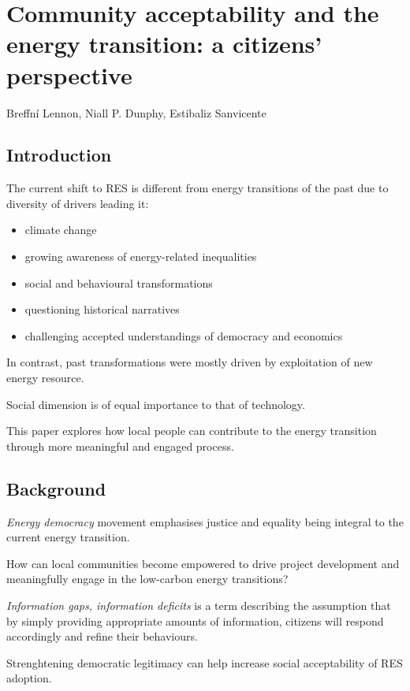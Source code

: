 \section{Community acceptability and the energy transition: a citizens'
perspective}
Breffní Lennon, Niall P. Dunphy, Estibaliz Sanvicente

\subsection{Introduction}

The current shift to RES is different from energy transitions of the past due
to diversity of drivers leading it:

\begin{itemize}
	\item climate change
	\item growing awareness of energy-related inequalities
	\item social and behavioural transformations
	\item questioning historical narratives
	\item challenging accepted understandings of democracy and economics
\end{itemize}

In contrast, past transformations were mostly driven by exploitation of new
energy resource.

Social dimension is of equal importance to that of technology.

This paper explores how local people can contribute to the energy transition
through more meaningful and engaged process.

\subsection{Background}

\textit{Energy democracy} movement emphasises justice and equality being
integral to the current energy transition.

How can local communities become empowered to drive project development and
meaningfully engage in the low-carbon energy transitions?

\textit{Information gaps, information deficits} is a term describing the
assumption that by simply providing appropriate amounts of information,
citizens will respond accordingly and refine their behaviours.

Strenghtening democratic legitimacy can help increase social acceptability of
RES adoption.

